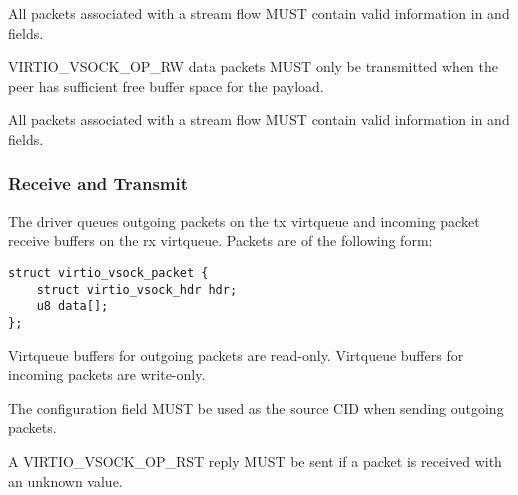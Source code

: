 All packets associated with a stream flow MUST contain valid information in
 and  fields.

VIRTIO_VSOCK_OP_RW data packets MUST only be transmitted when the peer has
sufficient free buffer space for the payload.

All packets associated with a stream flow MUST contain valid information in
 and  fields.

\subsubsection{Receive and Transmit}\label{sec:Device Types / Socket Device / Device Operation / Receive and Transmit}
The driver queues outgoing packets on the tx virtqueue and incoming packet
receive buffers on the rx virtqueue. Packets are of the following form:

\begin{lstlisting}
struct virtio_vsock_packet {
    struct virtio_vsock_hdr hdr;
    u8 data[];
};
\end{lstlisting}

Virtqueue buffers for outgoing packets are read-only. Virtqueue buffers for
incoming packets are write-only.


The  configuration field MUST be used as the source CID when
sending outgoing packets.

A VIRTIO_VSOCK_OP_RST reply MUST be sent if a packet is received with an
unknown  value.


